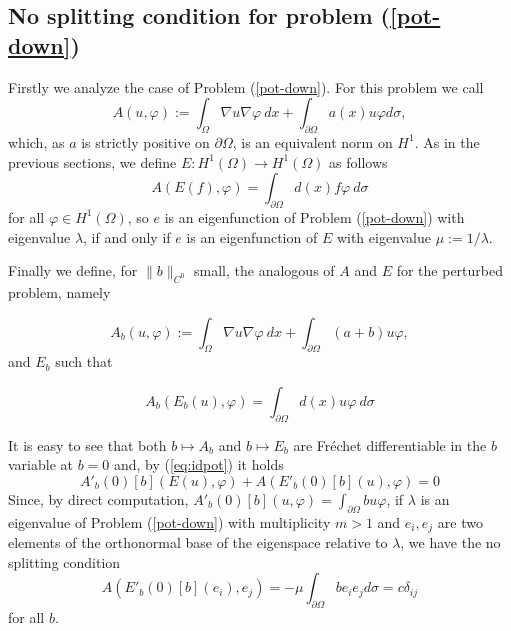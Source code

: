 \documentclass[a4paper,reqno,11pt,oneside]{amsart}
\theoremstyle{plain}
\theoremstyle{plain}
\theoremstyle{plain}
\theoremstyle{remark}
\begin{document}
\subsection{No splitting condition for problem (\ref{pot-down})}
Firstly we analyze the case of Problem (\ref{pot-down}). For this problem we call
\begin{equation}
    \label{defApot}
{A} (u,\varphi) :=\int_{\Omega} \nabla u \nabla  \varphi \ dx +\int_{\partial \Omega} a(x) u\varphi d\sigma,   
\end{equation}
which, as $a$ is strictly positive on $\partial \Omega$, is an equivalent norm on $H^1$.
As in the previous sections, we define $E:H^1(\Omega)\rightarrow H^1(\Omega)$ as follows
\begin{equation}\label{eq:Eusimp-down}
 {A} (E(f),\varphi)=\int_{\partial \Omega} d(x)f\varphi\  d\sigma 
\end{equation}
for all $\varphi \in H^1 (\Omega)$, so $e$ is an eigenfunction of Problem (\ref{pot-down})
with eigenvalue $\lambda$, if and only if $e$ is an eigenfunction of $E$ with eigenvalue $\mu:=1/\lambda$.

Finally we define, for $\|b\|_{C^0}$ small, the analogous of ${A} $ and $E$ for the perturbed problem, namely

\begin{equation}
{A}_b(u,\varphi) :=\int_{\Omega} \nabla u \nabla  \varphi \ dx +\int_{\partial \Omega} (a+b)u\varphi,   
\end{equation}
and $E_b$ such that


\begin{equation}\label{eq:idpot}
 {A}_b (E_b(u),\varphi)=\int_{\partial \Omega} d(x)u\varphi\  d\sigma 
\end{equation}

It is easy to see that both $b\mapsto {A}_b$ and $b\mapsto E_b$ are Fr\'echet differentiable in the $b$ variable at $b=0$ and, by (\ref{eq:idpot}) it holds
\begin{equation}
 {A'}_b(0)[b] (E(u),\varphi)+{A} (E'_b(0)[b](u),\varphi)=0 
\end{equation}
Since, by direct computation, $ {A'}_b(0)[b](u,\varphi)=\int_{\partial \Omega} bu\varphi$,  if $\lambda$ is an eigenvalue of Problem (\ref{pot-down}) with multiplicity $m>1$ and $e_i,e_j$ are two elements of the orthonormal base of the eigenspace relative to $\lambda$, we have the no splitting condition
\begin{equation}\label{nosplit-pot-down}
    {A} (E'_b(0)[b](e_i),e_j)=-\mu \int_{\partial \Omega}be_ie_jd\sigma=c\delta_{ij} 
\end{equation}
for all $b$. 
\end{document}
